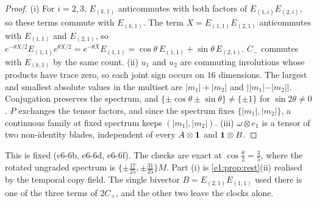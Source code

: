 \begin{proof}
(i) For $i=2,3$, $E_{(k,1)}$ anticommutes with both factors of $E_{(1,i)}E_{(2,i)}$, so these terms commute with $E_{(k,1)}$. The term
$X=E_{(1,1)}E_{(2,1)}$ anticommutes with $E_{(1,1)}$ and $E_{(2,1)}$, so $e^{-\theta X/2}E_{(1,1)}e^{\theta X/2}=e^{-\theta X}E_{(1,1)}=\cos\theta\,E_{(1,1)}+\sin\theta\,E_{(2,1)}$.
$C_-$ commutes with $E_{(k,1)}$ by the same count. (ii) $u_1$ and $u_2$ are commuting involutions whose products have trace zero, so each joint sign
occurs on $16$ dimensions. The largest and smallest absolute values in the multiset are $|m_1|+|m_2|$ and $||m_1|-|m_2||$. Conjugation preserves the
spectrum, and $\{\pm\cos\theta\pm\sin\theta\}\neq\{\pm1\}$ for $\sin2\theta\neq0$. $P$ exchanges the tensor factors, and since the spectrum fixes
$\{|m_1|,|m_2|\}$, a continuous family at fixed spectrum keeps $(|m_1|,|m_2|)$. (iii) $\omega\otimes e_1$ is a tensor of two non-identity blades, independent of every
$A\otimes\mathbf 1$ and $\mathbf 1\otimes B$.
\end{proof}

This is fixed (e6-6b, e6-6d, e6-6f). The checks are exact at $\cos\tfrac\theta2=\tfrac35$, where the rotated ungraded spectrum is
$\{\pm\tfrac{17}{25},\pm\tfrac{31}{25}\}M$. Part (i) is \cref{e1:prop:rest}(ii) realised by the temporal copy field. The single bivector $B=E_{(2,1)}E_{(1,1)}$
used there is one of the three terms of $2C_+$, and the other two leave the clocks alone.

